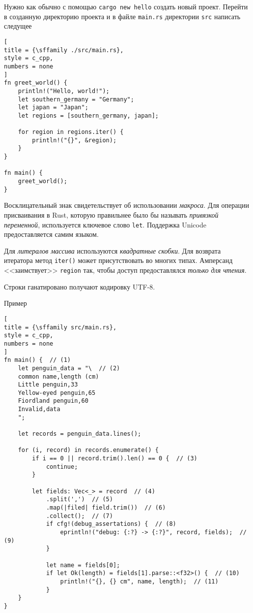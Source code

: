 \documentclass[%
	11pt,
	a4paper,
	utf8,
		]{article}
\begin{document}
Нужно как обычно с помощью \texttt{cargo new hello} создать новый проект. Перейти в созданную директорию проекта и в файле \texttt{main.rs} директории \texttt{src} написать следущее
\begin{lstlisting}[			
title = {\sffamily ./src/main.rs},
style = c_cpp,
numbers = none
]
fn greet_world() {
    println!("Hello, world!");
    let southern_germany = "Germany";
    let japan = "Japan";
    let regions = [southern_germany, japan];
    
    for region in regions.iter() {
        println!("{}", &region);
    }
}

fn main() {
    greet_world();
}
\end{lstlisting}

Восклицательный знак свидетельствует об использовании \emph{макроса}. Для операции присваивания в Rust, которую правильнее было бы называть \emph{привязкой переменной}, используется ключевое слово \texttt{let}. Поддержка Unicode предоставляется самим языком. 

Для \emph{литералов массива} используются \emph{квадратные скобки}. Для возврата итератора метод \texttt{iter()} может присутствовать во многих типах. Амперсанд <<заимствует>> \texttt{region} так, чтобы доступ предоставлялся \emph{только для чтения}.

Строки ганатировано получают кодировку UTF-8.

Пример
\begin{lstlisting}[
title = {\sffamily src/main.rs},
style = c_cpp,
numbers = none
]
fn main() {  // (1)
    let penguin_data = "\  // (2)
    common name,length (cm)
    Little penguin,33
    Yellow-eyed penguin,65
    Fiordland penguin,60
    Invalid,data
    ";
    
    let records = penguin_data.lines();
    
    for (i, record) in records.enumerate() {
        if i == 0 || record.trim().len() == 0 {  // (3)
            continue;
        }
    
        let fields: Vec<_> = record  // (4)
            .split(',')  // (5)
            .map(|filed| field.trim())  // (6)
            .collect();  // (7)
            if cfg!(debug_assertations) {  // (8)
                eprintln!("debug: {:?} -> {:?}", record, fields);  // (9)
            }
        
            let name = fields[0];
            if let Ok(length) = fields[1].parse::<f32>() {  // (10)
                println!("{}, {} cm", name, length);  // (11)
            }
    }
}
\end{lstlisting}
\end{document}
